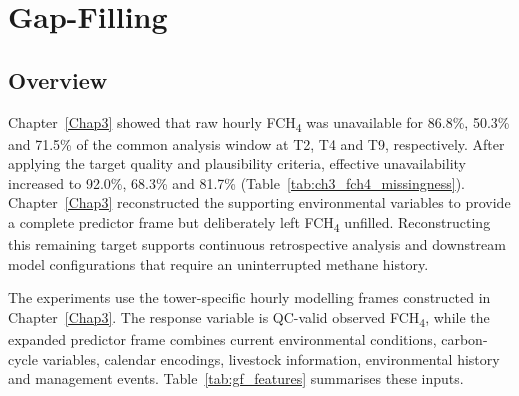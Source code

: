 \chapter{Gap-Filling} \label{Chap4}

\section{Overview}

Chapter~\ref{Chap3} showed that raw hourly FCH\textsubscript{4} was unavailable
for 86.8\%, 50.3\% and 71.5\% of the common analysis window at T2, T4 and T9,
respectively. After applying the target quality and plausibility criteria,
effective unavailability increased to 92.0\%, 68.3\% and 81.7\%
(Table~\ref{tab:ch3_fch4_missingness}). Chapter~\ref{Chap3} reconstructed the
supporting environmental variables to provide a complete predictor frame but
deliberately left FCH\textsubscript{4} unfilled. Reconstructing this remaining
target supports continuous retrospective analysis and downstream model
configurations that require an uninterrupted methane history.

The experiments use the tower-specific hourly modelling frames constructed in
Chapter~\ref{Chap3}. The response variable is QC-valid observed
FCH\textsubscript{4}, while the expanded predictor frame combines current
environmental conditions, carbon-cycle variables, calendar encodings,
livestock information, environmental history and management events.
Table~\ref{tab:gf_features} summarises these inputs.

